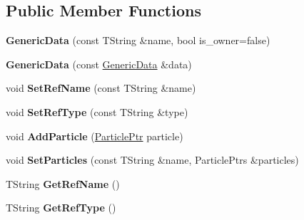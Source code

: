 \subsection*{Public Member Functions}
\begin{DoxyCompactItemize}
\item 
\hypertarget{class_h_a_l_1_1_generic_data_ab2966008650b9dd6268688b26efac4ca}{{\bfseries Generic\-Data} (const T\-String \&name, bool is\-\_\-owner=false)}\label{class_h_a_l_1_1_generic_data_ab2966008650b9dd6268688b26efac4ca}

\item 
\hypertarget{class_h_a_l_1_1_generic_data_a0fc1d60fb890078bc42110602aad77a4}{{\bfseries Generic\-Data} (const \hyperlink{class_h_a_l_1_1_generic_data}{Generic\-Data} \&data)}\label{class_h_a_l_1_1_generic_data_a0fc1d60fb890078bc42110602aad77a4}

\item 
\hypertarget{class_h_a_l_1_1_generic_data_abbc23d840eb192ab59fb01645ae33d51}{void {\bfseries Set\-Ref\-Name} (const T\-String \&name)}\label{class_h_a_l_1_1_generic_data_abbc23d840eb192ab59fb01645ae33d51}

\item 
\hypertarget{class_h_a_l_1_1_generic_data_a3a19cd023aa97a81882f04e633fedbe5}{void {\bfseries Set\-Ref\-Type} (const T\-String \&type)}\label{class_h_a_l_1_1_generic_data_a3a19cd023aa97a81882f04e633fedbe5}

\item 
\hypertarget{class_h_a_l_1_1_generic_data_aca471249ad858ca39c41c66aa505ccb7}{void {\bfseries Add\-Particle} (\hyperlink{class_h_a_l_1_1_generic_particle}{Particle\-Ptr} particle)}\label{class_h_a_l_1_1_generic_data_aca471249ad858ca39c41c66aa505ccb7}

\item 
\hypertarget{class_h_a_l_1_1_generic_data_ac706724c448857289357f788eff350d7}{void {\bfseries Set\-Particles} (const T\-String \&name, Particle\-Ptrs \&particles)}\label{class_h_a_l_1_1_generic_data_ac706724c448857289357f788eff350d7}

\item 
\hypertarget{class_h_a_l_1_1_generic_data_a91b0d760e71de318a15b02bb8492035a}{T\-String {\bfseries Get\-Ref\-Name} ()}\label{class_h_a_l_1_1_generic_data_a91b0d760e71de318a15b02bb8492035a}

\item 
\hypertarget{class_h_a_l_1_1_generic_data_a4ed8d5cf423876674eddd941e5c93890}{T\-String {\bfseries Get\-Ref\-Type} ()}\label{class_h_a_l_1_1_generic_data_a4ed8d5cf423876674eddd941e5c93890}


\end{DoxyCompactItemize}
